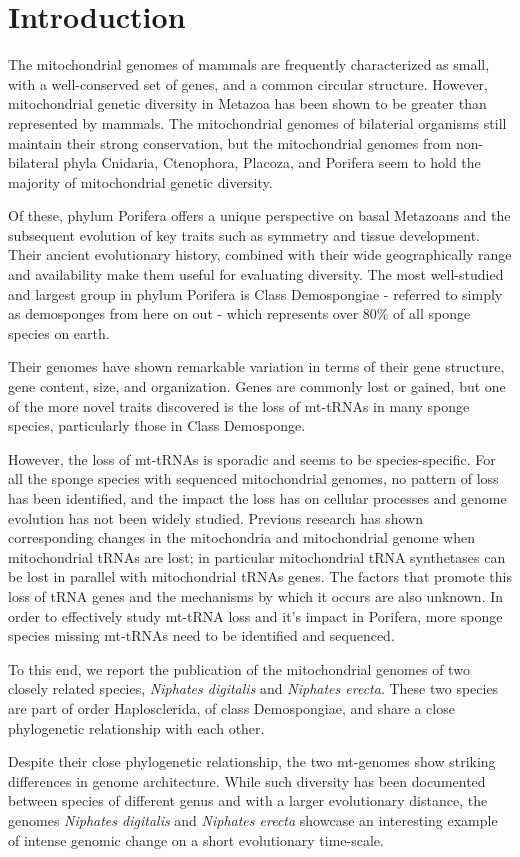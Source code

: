 \documentclass[../main.tex]{subfiles}
\begin{document}
\newpage
\section{Introduction}
The mitochondrial genomes of mammals are frequently characterized as small, with a well-conserved set of genes, and a common circular structure. However,  mitochondrial genetic diversity in Metazoa has been shown to be greater than represented by mammals. The mitochondrial genomes of bilaterial organisms still maintain their strong conservation, but the mitochondrial genomes from non-bilateral phyla Cnidaria, Ctenophora, Placoza, and Porifera seem to hold the majority of mitochondrial genetic diversity. 

Of these, phylum Porifera offers a unique perspective on basal Metazoans and the subsequent evolution of key traits such as symmetry and tissue development. Their ancient evolutionary history, combined with their wide geographically range and availability make them useful for evaluating diversity. The most well-studied and largest group in phylum Porifera is Class Demospongiae - referred to simply as demosponges from here on out - which represents over 80\% of all sponge species on earth. 

Their genomes have shown remarkable variation in terms of their gene structure, gene content, size, and organization. Genes are commonly lost or gained, but one of the more novel traits discovered is the loss of mt-tRNAs in many sponge species, particularly those in Class Demosponge. 

However, the loss of mt-tRNAs is sporadic and seems to be species-specific. For all the sponge species with sequenced mitochondrial genomes, no pattern of loss has been identified, and the impact the loss has on cellular processes and genome evolution has not been widely studied. Previous research has shown corresponding changes in the mitochondria and mitochondrial genome when mitochondrial tRNAs are lost; in particular mitochondrial tRNA synthetases can be lost in parallel with mitochondrial tRNAs genes. The factors that promote this loss of tRNA genes and the mechanisms by which it occurs are also unknown. In order to effectively study mt-tRNA loss and it's impact in Porifera, more sponge species missing mt-tRNAs need to be identified and sequenced.

To this end, we report the publication of the mitochondrial genomes of two closely related species, \emph{Niphates digitalis} and \emph{Niphates erecta}. These two species are part of order Haplosclerida, of class Demospongiae, and share a close phylogenetic relationship with each other.

Despite their close phylogenetic relationship, the two mt-genomes show striking differences in genome architecture. While such diversity has been documented between species of different genus and with a larger evolutionary distance, the genomes \emph{Niphates digitalis} and \emph{Niphates erecta} showcase an interesting example of intense genomic change on a short evolutionary time-scale. 
\end{document}
